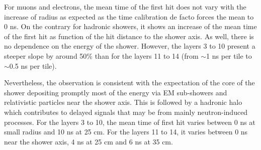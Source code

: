 For muons and electrons, the mean time of the first hit does not vary with the increase of radius as expected as the time calibration de facto forces the mean to 0 ns. On the contrary for hadronic showers, it shows an increase of the mean time of the first hit as function of the hit distance to the shower axis. As well, there is no dependence on the energy of the shower. However, the layers 3 to 10 present a steeper slope by around 50\% than for the layers 11 to 14 (from $\sim$1 ns per tile to $\sim$0.5 ns per tile).

Nevertheless, the observation is consistent with the expectation of the core of the shower depositing promptly most of the energy via EM sub-showers and relativistic particles near the shower axis. This is followed by a hadronic halo which contributes to delayed signals that may be from mainly neutron-induced processes. For the layers 3 to 10, the mean time of first hit varies between 0 ns at small radius and 10 ns at 25 cm. For the layers 11 to 14, it varies between 0 ns near the shower axis, 4 ns at 25 cm and 6 ns at 35 cm.

